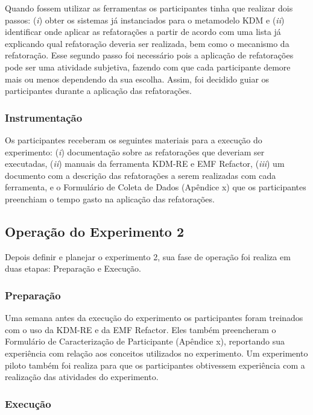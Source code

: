 Quando fossem utilizar as ferramentas os participantes tinha que realizar dois passos: (\textit{i}) obter os sistemas já instanciados para o metamodelo KDM e (\textit{ii}) identificar onde aplicar as refatorações a partir de acordo com uma lista já explicando qual refatoração deveria ser realizada, bem como o mecanismo da refatoração. Esse segundo passo foi necessário pois a aplicação de refatorações pode ser uma atividade subjetiva, fazendo com que cada participante demore mais ou menos dependendo da sua escolha. Assim, foi decidido guiar os participantes durante a aplicação das refatorações. 

\subsubsection{Instrumentação}

Os participantes receberam os seguintes materiais para a execução do experimento: (\textit{i}) documentação sobre as refatorações que deveriam ser executadas, (\textit{ii}) manuais da ferramenta KDM-RE e EMF Refactor, (\textit{iii}) um documento com a descrição das refatorações a serem realizadas com cada ferramenta, e o Formulário de Coleta de Dados (Apêndice x) que os participantes preenchiam o tempo gasto na aplicação das refatorações.


\subsection{Operação do Experimento 2}

Depois definir e planejar o experimento 2, sua fase de operação foi realiza em duas etapas: Preparação e Execução.

\subsubsection{Preparação}

Uma semana antes da execução do experimento os participantes foram treinados com o uso da KDM-RE e da EMF Refactor. Eles também preencheram o Formulário de Caracterização de Participante (Apêndice x), reportando sua experiência com relação aos conceitos utilizados no experimento. Um experimento piloto também foi realiza para que os participantes obtivessem experiência com a realização das atividades do experimento.

\subsubsection{Execução}

